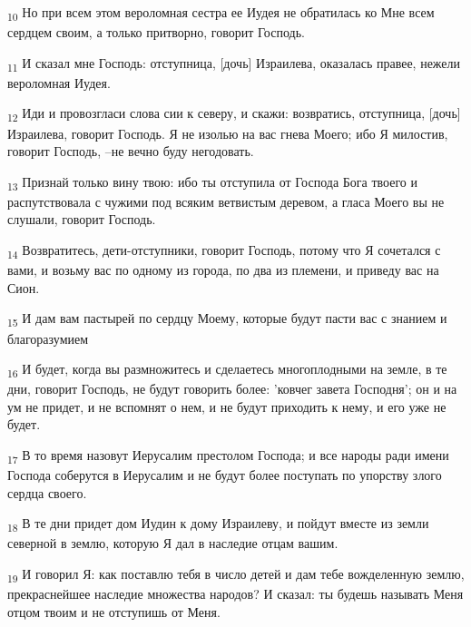 \begin{tcolorbox}
\textsubscript{10} Но при всем этом вероломная сестра ее Иудея не обратилась ко Мне всем сердцем своим, а только притворно, говорит Господь.
\end{tcolorbox}
\begin{tcolorbox}
\textsubscript{11} И сказал мне Господь: отступница, [дочь] Израилева, оказалась правее, нежели вероломная Иудея.
\end{tcolorbox}
\begin{tcolorbox}
\textsubscript{12} Иди и провозгласи слова сии к северу, и скажи: возвратись, отступница, [дочь] Израилева, говорит Господь. Я не изолью на вас гнева Моего; ибо Я милостив, говорит Господь, --не вечно буду негодовать.
\end{tcolorbox}
\begin{tcolorbox}
\textsubscript{13} Признай только вину твою: ибо ты отступила от Господа Бога твоего и распутствовала с чужими под всяким ветвистым деревом, а гласа Моего вы не слушали, говорит Господь.
\end{tcolorbox}
\begin{tcolorbox}
\textsubscript{14} Возвратитесь, дети-отступники, говорит Господь, потому что Я сочетался с вами, и возьму вас по одному из города, по два из племени, и приведу вас на Сион.
\end{tcolorbox}
\begin{tcolorbox}
\textsubscript{15} И дам вам пастырей по сердцу Моему, которые будут пасти вас с знанием и благоразумием
\end{tcolorbox}
\begin{tcolorbox}
\textsubscript{16} И будет, когда вы размножитесь и сделаетесь многоплодными на земле, в те дни, говорит Господь, не будут говорить более: 'ковчег завета Господня'; он и на ум не придет, и не вспомнят о нем, и не будут приходить к нему, и его уже не будет.
\end{tcolorbox}
\begin{tcolorbox}
\textsubscript{17} В то время назовут Иерусалим престолом Господа; и все народы ради имени Господа соберутся в Иерусалим и не будут более поступать по упорству злого сердца своего.
\end{tcolorbox}
\begin{tcolorbox}
\textsubscript{18} В те дни придет дом Иудин к дому Израилеву, и пойдут вместе из земли северной в землю, которую Я дал в наследие отцам вашим.
\end{tcolorbox}
\begin{tcolorbox}
\textsubscript{19} И говорил Я: как поставлю тебя в число детей и дам тебе вожделенную землю, прекраснейшее наследие множества народов? И сказал: ты будешь называть Меня отцом твоим и не отступишь от Меня.
\end{tcolorbox}
